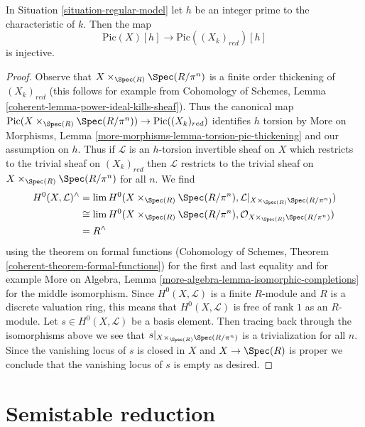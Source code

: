 \begin{lemma}
\label{lemma-torsion-embeds}
In Situation \ref{situation-regular-model} let $h$ be an integer
prime to the characteristic of $k$. Then the map
$$
\text{Pic}(X)[h] \longrightarrow \text{Pic}((X_k)_{red})[h]
$$
is injective.
\end{lemma}

\begin{proof}
Observe that $X \times_{\Spec(R)} \Spec(R/\pi^n)$ is a finite
order thickening of $(X_k)_{red}$ (this follows for example from
Cohomology of Schemes, Lemma \ref{coherent-lemma-power-ideal-kills-sheaf}).
Thus the canonical map
$\text{Pic}(X \times_{\Spec(R)} \Spec(R/\pi^n)) \to \text{Pic}((X_k)_{red})$
identifies $h$ torsion by
More on Morphisms, Lemma \ref{more-morphisms-lemma-torsion-pic-thickening}
and our assumption on $h$.
Thus if $\mathcal{L}$ is an $h$-torsion invertible sheaf on $X$
which restricts to the trivial sheaf on $(X_k)_{red}$ then
$\mathcal{L}$ restricts to the trivial sheaf on
$X \times_{\Spec(R)} \Spec(R/\pi^n)$ for all $n$.
We find
\begin{align*}
H^0(X, \mathcal{L})^\wedge
& =
\lim H^0(X \times_{\Spec(R)} \Spec(R/\pi^n),
\mathcal{L}|_{X \times_{\Spec(R)} \Spec(R/\pi^n)}) \\
& \cong
\lim H^0(X \times_{\Spec(R)} \Spec(R/\pi^n),
\mathcal{O}_{X \times_{\Spec(R)} \Spec(R/\pi^n)}) \\
& =
R^\wedge
\end{align*}
using the theorem on formal functions
(Cohomology of Schemes, Theorem \ref{coherent-theorem-formal-functions})
for the first and last equality and for example
More on Algebra, Lemma \ref{more-algebra-lemma-isomorphic-completions}
for the middle isomorphism. Since $H^0(X, \mathcal{L})$ is a finite
$R$-module and $R$ is a discrete valuation ring, this means that
$H^0(X, \mathcal{L})$ is free of rank $1$ as an $R$-module.
Let $s \in H^0(X, \mathcal{L})$ be a basis element.
Then tracing back through the isomorphisms above we see
that $s|_{X \times_{\Spec(R)} \Spec(R/\pi^n)}$ is a trivialization
for all $n$. Since the vanishing locus of $s$ is closed in $X$
and $X \to \Spec(R)$ is proper we conclude that the vanishing
locus of $s$ is empty as desired.
\end{proof}






\section{Semistable reduction}
\label{section-semistable-reduction}

